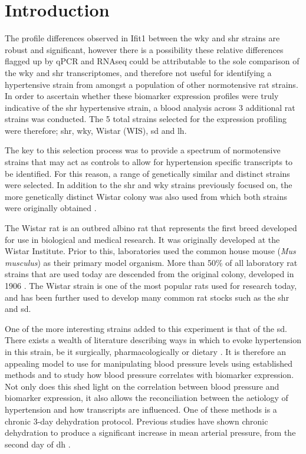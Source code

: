 \doublespacing

\section{Introduction}

The profile differences observed in Ifit1 between the \acrshort{wky} and \acrshort{shr} strains are robust and significant, however there is a possibility these relative differences flagged up by qPCR and RNAseq could be attributable to the sole comparison of the \acrshort{wky} and \acrshort{shr} transcriptomes, and therefore not useful for identifying a hypertensive strain from amongst a population of other normotensive rat strains. In order to ascertain whether these biomarker expression profiles were truly indicative of the \acrshort{shr} hypertensive strain, a blood analysis across 3 additional rat strains was conducted. The 5 total strains selected for the expression profiling were therefore; \acrfull{shr}, \acrfull{wky}, Wistar (WIS), \acrfull{sd} and \acrfull{lh}. 

The key to this selection process was to provide a spectrum of normotensive strains that may act as controls to allow for hypertension specific transcripts to be identified. For this reason, a range of genetically similar and distinct strains were selected. In addition to the \acrshort{shr} and \acrshort{wky} strains previously focused on, the more genetically distinct Wistar colony was also used from which both strains were originally obtained \cite{NAP20031}.

The Wistar rat is an outbred albino rat that represents the first breed developed for use in biological and medical research. It was originally developed at the Wistar Institute. Prior to this, laboratories used the common house mouse (\textit{Mus musculus}) as their primary model organism. More than 50\% of all laboratory rat strains that are used today are descended from the original colony, developed in 1906 \cite{Clause1998}. The Wistar strain is one of the most popular rats used for research today, and has been further used to develop many common rat stocks such as the \acrshort{shr} and \acrshort{sd}. 

One of the more interesting strains added to this experiment is that of the \acrshort{sd}. There exists a wealth of literature describing ways in which to evoke hypertension in this strain, be it surgically, pharmacologically or dietary \cite{DAngelo2005, Alexander2001, Bayorh2003}. It is therefore an appealing model to use for manipulating blood pressure levels using established methods and to study how blood pressure correlates with biomarker expression. Not only does this shed light on the correlation between blood pressure and biomarker expression, it also allows the reconciliation between the aetiology of hypertension and how transcripts are influenced. One of these methods is a chronic 3-day dehydration protocol. Previous studies have shown chronic dehydration to produce a significant increase in mean arterial pressure, from the second day of \acrfull{dh} \cite{Colombari2011}.

